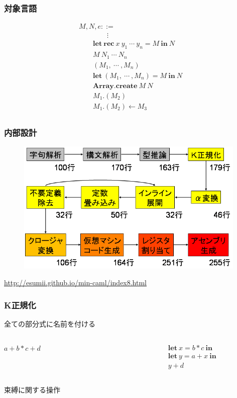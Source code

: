 \documentclass[dvipdfmx,cjk,xcolor=dvipsnames,envcountsect,notheorems,12pt]{beamer}
\theoremstyle{definition}
\newcommand{\keyword}[1]{\mathbf{#1}}
\newcommand{\LET}{\keyword{let}}
\newcommand{\REC}{\keyword{rec}}
\newcommand{\ARRAY}{\keyword{Array}}
\newcommand{\CREATE}{\keyword{create}}
\newcommand{\IN}{\keyword{in}}
\begin{document}
\begin{frame}
	\frametitle{対象言語}
	\Large
	\[
	\begin{array}{l}
		M, N, e ::= \\
		\qquad \qquad \vdots\\
		\qquad \LET~\REC~x~y_1~\cdots~y_n=M~\IN~N\\
		\qquad M~N_1~\cdots~N_n\\
		\qquad (M_1,~\cdots~,M_n)\\
		\qquad \LET~(M_1,~\cdots~,M_n)=M~\IN~N\\
		\qquad \ARRAY.\CREATE~M~N\\
		\qquad M_1.(M_2)\\
		\qquad M_1.(M_2)\leftarrow M_3\\
	\end{array}
	\]
\end{frame}

\begin{frame}
	\frametitle{内部設計}
	\begin{figure}[htb]
		\centering
		\includegraphics[width=11cm,clip]{mincaml.png}
	\end{figure}
	{\footnotesize \url{http://esumii.github.io/min-caml/index8.html}}
\end{frame}

\begin{frame}
	\frametitle{K正規化}
	\LARGE
	全ての部分式に名前を付ける

	\begin{columns}
		\begin{column}{0.5\textwidth}
			\begin{center}
				$a+b*c+d$
			\end{center}
		\end{column}
		\begin{column}{0.5\textwidth}
			\begin{center}
				\[
					\begin{array}{l}
						\LET~x = b * c~\IN \\
						\LET~y = a + x~\IN \\
						y + d
					\end{array}
				\]
			\end{center}
		\end{column}
	\end{columns}

	\vfill

	束縛に関する操作
\end{frame}
\end{document}
